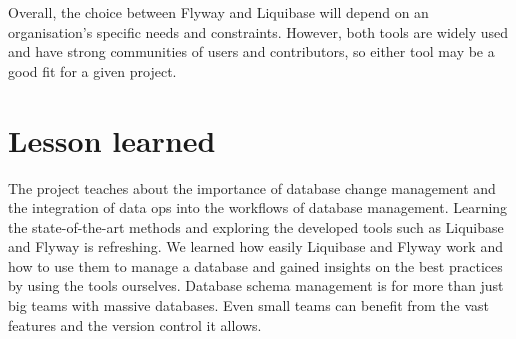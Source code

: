 Overall, the choice between Flyway and Liquibase will depend on an organisation's specific needs and constraints. However, both tools are widely used and have strong communities of users and contributors, so either tool may be a good fit for a given project.

\section{Lesson learned}
The project teaches about the importance of database change management and the integration of data ops into the workflows of database management. Learning the state-of-the-art methods and exploring the developed tools such as Liquibase and Flyway is refreshing. We learned how easily Liquibase and Flyway work and how to use them to manage a database and gained insights on the best practices by using the tools ourselves. Database schema management is for more than just big teams with massive databases. Even small teams can benefit from the vast features and the version control it allows.









